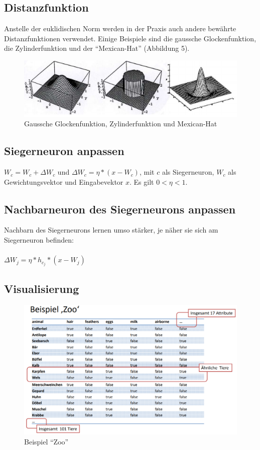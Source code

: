\documentclass[11pt]{article}
\begin{document}
    \subsection{Distanzfunktion}
    Anstelle der euklidischen Norm werden in der Praxis auch andere bewährte Distanzfunktionen
    verwendet. Einige Beispiele sind die gaussche Glockenfunktion, die Zylinderfunktion und der
    "`Mexican-Hat"' (Abbildung 5).

    \begin{figure}[ht!]
        \centering
        \includegraphics[width=12cm]{../../resources/distanzfunktionen.png}
        \caption{Gaussche Glockenfunktion, Zylinderfunktion und Mexican-Hat}
    \end{figure}


    \subsection{Siegerneuron anpassen}
    $W_c = W_c + \Delta W_c$ und $\Delta W_c = \eta * (x-W_c)$, mit $c$ als Siegerneuron, $W_c$ als
    Gewichtungsvektor und Eingabevektor $x$. Es gilt $0 < \eta < 1$.


    \subsection{Nachbarneuron des Siegerneurons anpassen}
    Nachbarn des Siegerneurons lernen umso stärker, je näher sie sich am Siegerneuron befinden:\\~\\
    $\Delta W_j = \eta * h_c_j * (x - W_j)$
    \newpage

    \subsection{Visualisierung}
    \begin{figure}[ht!]
        \centering
        \includegraphics[width=15cm]{../../resources/zoo_table.png}
        \caption{Beispiel "`Zoo"'}
    \end{figure}
\end{document}
